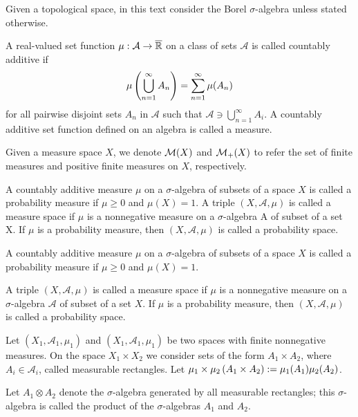 Given a topological space, in this text consider the Borel $\sigma$-algebra unless stated otherwise. 

\begin{definition}[Measure]
	A real-valued set function $\mu:\mathcal{A}\rightarrow \overline{\mathbb{R}}$ on a class of sets $\mathcal A$ is called countably additive if 
	\begin{equation*}
		\mu\left( \bigcup_{n=1}^{\infty} A_n \right)=\sum_{n=1}^{\infty}\mu(A_n)
	\end{equation*}
	for all pairwise disjoint sets $A_n$ in $\mathcal A$ such that $\mathcal A \ni \bigcup_{n=1}^{\infty}A_i$. A countably additive set function defined on an algebra is called a measure.
\end{definition}

Given a measure space $X$, we denote $\mathcal{M}(X)$ and $\mathcal{M}_+(X)$ to refer the set of finite measures and positive finite measures on $X$, respectively. 

\begin{definition}
	A countably additive measure $\mu$ on a $\sigma$-algebra of subsets of a space $X$ is called a probability measure if $\mu\geq 0$ and $\mu(X)=1$.
	A triple $(X, \mathcal A, \mu)$ is called a measure space if $\mu$ is a
	nonnegative measure on a $\sigma$-algebra A of subset of a set X. If $\mu$ is a probability measure, then $(X, \mathcal A, \mu)$ is called a probability space. 
\end{definition}


\begin{definition}
\end{definition}

\begin{definition}
\end{definition}

\begin{definition}[Probability]
	A countably additive measure $\mu$ on a $\sigma$-algebra of subsets of a space $X$ is called a probability measure if $\mu \geq 0$ and $\mu(X)= 1$.
	
	A triple $(X, \mathcal A, \mu )$ is called a measure space if $\mu$ is a
	nonnegative measure on a $\sigma$-algebra $\mathcal A$ of subset of a set $X$. If $\mu$ is a probability measure, then $(X, \mathcal A, \mu)$ is called a probability space.
\end{definition}

\begin{definition}
Let $\left(X_1 , \mathcal{A}_1 , \mu_1 \right)$ and $\left(X_1 , \mathcal{A}_1 , \mu_1 \right)$ be two spaces with finite nonnegative measures. On the space $X_1\times X_2$ we consider sets of the form $A_1\times A_2$, where $A_i \in \mathcal{A}_i$, called measurable rectangles. Let $\mu_1\times \mu_2 \left( A_1\times A_2 \right):= \mu_1(A_1)\mu_2(A_2)$. 

Let $A_1\otimes A_2$ denote the $\sigma$-algebra generated by all measurable rectangles; this $\sigma$-algebra is called the product of the $\sigma$-algebras $A_1$ and $A_2$.  
\end{definition}

